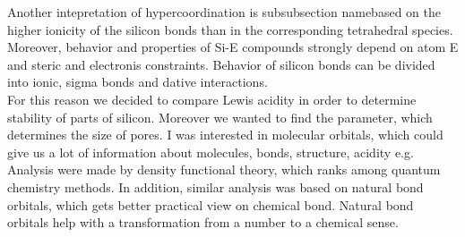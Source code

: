 \documentclass[
  digital, %
  table,   %
  lof,     %
  lot,     %
]{fithesis3}
\begin{document}
 Another intepretation of hypercoordination is subsubsection namebased on the higher ionicity of the silicon bonds than in the corresponding tetrahedral species. Moreover, behavior and properties of Si-E compounds strongly depend on atom E and steric and electronis constraints. Behavior of silicon bonds can be divided into ionic, sigma bonds and dative interactions. \cite{Wagler2014}\\
For this reason we decided to compare Lewis acidity in order to determine stability of parts of silicon. Moreover we wanted to find the parameter, which determines the size of pores. I was interested in molecular orbitals, which could give us a lot of information about molecules, bonds, structure, acidity e.g. Analysis were made by density functional theory, which ranks among quantum chemistry methods. In addition, similar analysis was based on natural bond orbitals, which gets better practical view on chemical bond. Natural bond orbitals help with a transformation from a number to a chemical sense.
\end{document}
